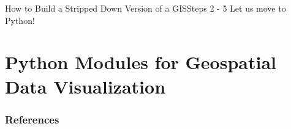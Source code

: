 \documentclass[notes, aspectratio=1610]{beamer}
\begin{document}
\begin{frame}{How to Build a Stripped Down Version of a GIS}{Steps 2 - 5}
\centering
\Large
Let us move to Python!
\end{frame}

\section{Python Modules for Geospatial Data Visualization}

\begin{frame}{}{}
\end{frame}

\begin{frame}
	\frametitle{References}
	\printbibliography
\end{frame} 
\end{document}
